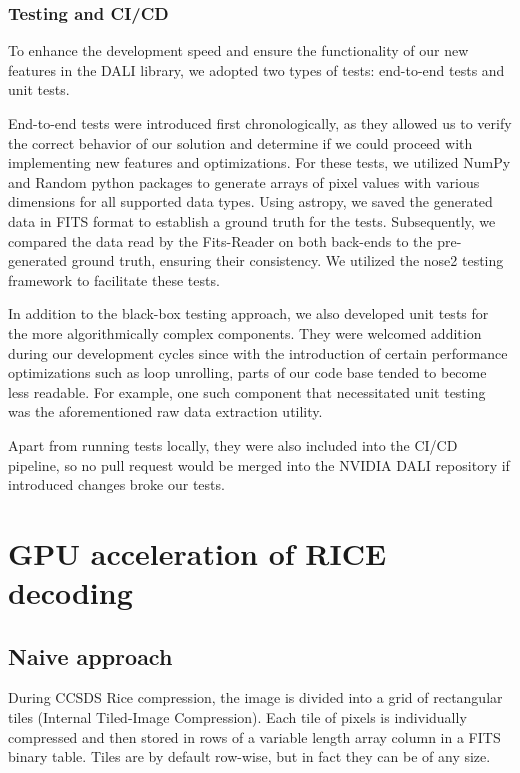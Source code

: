 \documentclass[licencjacka,en]{pracamgr}
\begin{document}
\subsection{Testing and CI/CD} 
To enhance the development speed and ensure the functionality of our new features in the DALI library, we adopted two types of tests: end-to-end tests and unit tests.

End-to-end tests were introduced first chronologically, as they allowed us to verify the correct behavior of our solution and determine if we could proceed with implementing new features and optimizations. For these tests, we utilized NumPy and Random python packages to generate arrays of pixel values with various dimensions for all supported data types. Using astropy, we saved the generated data in FITS format to establish a ground truth for the tests. Subsequently, we compared the data read by the Fits-Reader on both back-ends to the pre-generated ground truth, ensuring their consistency. We utilized the nose2 testing framework to facilitate these tests.

In addition to the black-box testing approach, we also developed unit tests for the more algorithmically complex components. They
were welcomed addition during our development cycles since with the introduction of certain performance optimizations such as loop unrolling, parts of our code base tended to become less readable. For example, one such component that necessitated unit testing was the aforementioned raw data extraction utility. 

Apart from running tests locally, they were also included into the CI/CD pipeline, so no pull request would be merged into the NVIDIA DALI repository if introduced changes broke our tests. 

\chapter{GPU acceleration of RICE decoding}

\section{Naive approach}\label{r:algo}

During CCSDS Rice compression, the image is divided into a grid of rectangular tiles (Internal Tiled-Image Compression). Each tile of pixels is individually compressed and then stored in rows of a variable length array column in a FITS binary table. Tiles are by default row-wise, but in fact they can be of any size.
\end{document}
